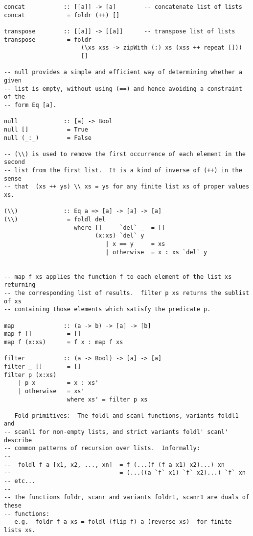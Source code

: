 \begin{verbatim}
concat           :: [[a]] -> [a]        -- concatenate list of lists
concat            = foldr (++) []

transpose        :: [[a]] -> [[a]]      -- transpose list of lists
transpose         = foldr
                      (\xs xss -> zipWith (:) xs (xss ++ repeat []))
                      []

-- null provides a simple and efficient way of determining whether a given
-- list is empty, without using (==) and hence avoiding a constraint of the
-- form Eq [a].

null             :: [a] -> Bool
null []           = True
null (_:_)        = False

-- (\\) is used to remove the first occurrence of each element in the second
-- list from the first list.  It is a kind of inverse of (++) in the sense
-- that  (xs ++ ys) \\ xs = ys for any finite list xs of proper values xs.

(\\)             :: Eq a => [a] -> [a] -> [a]
(\\)              = foldl del
                    where []     `del` _  = []
                          (x:xs) `del` y
                             | x == y     = xs
                             | otherwise  = x : xs `del` y


-- map f xs applies the function f to each element of the list xs returning
-- the corresponding list of results.  filter p xs returns the sublist of xs
-- containing those elements which satisfy the predicate p.
 
map              :: (a -> b) -> [a] -> [b]
map f []          = []
map f (x:xs)      = f x : map f xs

filter           :: (a -> Bool) -> [a] -> [a]
filter _ []       = []
filter p (x:xs)
    | p x         = x : xs'
    | otherwise   = xs'
                  where xs' = filter p xs

-- Fold primitives:  The foldl and scanl functions, variants foldl1 and
-- scanl1 for non-empty lists, and strict variants foldl' scanl' describe
-- common patterns of recursion over lists.  Informally:
--
--  foldl f a [x1, x2, ..., xn]  = f (...(f (f a x1) x2)...) xn
--                               = (...((a `f` x1) `f` x2)...) `f` xn
-- etc...
--
-- The functions foldr, scanr and variants foldr1, scanr1 are duals of these
-- functions:
-- e.g.  foldr f a xs = foldl (flip f) a (reverse xs)  for finite lists xs.


\end{verbatim}
